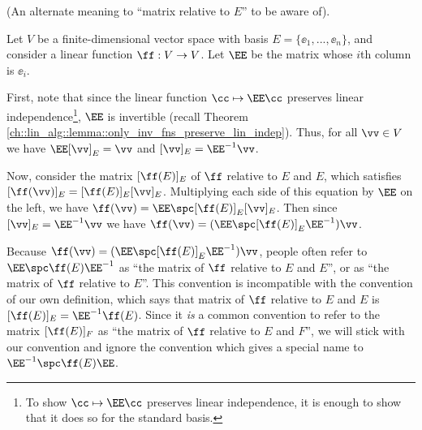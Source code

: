 \begin{remark}
    (An alternate meaning to ``matrix relative to $E$'' to be aware of).
    
    Let $V$ be a finite-dimensional vector space with basis $E = \{\ee_1, ..., \ee_n\}$, and consider a linear function $\ff:V \rightarrow V$. Let $\EE$ be the matrix whose $i$th column is $\ee_i$.
    
    First, note that since the linear function $\cc \mapsto \EE \cc$ preserves linear independence\footnote{To show $\cc \mapsto \EE \cc$ preserves linear independence, it is enough to show that it does so for the standard basis.}, $\EE$ is invertible (recall Theorem \ref{ch::lin_alg::lemma::only_inv_fns_preserve_lin_indep}). Thus, for all $\vv \in V$ we have $\EE [\vv]_E = \vv$ and $[\vv]_E = \EE^{-1} \vv$. 
    
    Now, consider the matrix $[\ff(E)]_E$ of $\ff$ relative to $E$ and $E$, which satisfies $[\ff(\vv)]_E = [\ff(E)]_E [\vv]_E$. Multiplying each side of this equation by $\EE$ on the left, we have $\ff(\vv) = \EE \spc [\ff(E)]_E [\vv]_E$. Then since $[\vv]_E = \EE^{-1} \vv$ we have ${\ff(\vv) = (\EE \spc [\ff(E)]_E \EE^{-1}) \vv}$.
    
    Because $\ff(\vv) = (\EE \spc [\ff(E)]_E \EE^{-1}) \vv$, people often refer to $\EE \spc \ff(E) \EE^{-1}$ as ``the matrix of $\ff$ relative to $E$ and $E$'', or as ``the matrix of $\ff$ relative to $E$''. This convention is incompatible with the convention of our own definition, which says that matrix of $\ff$ relative to $E$ and $E$ is $[\ff(E)]_E = \EE^{-1} \ff(E)$. Since it \textit{is} a common convention to refer to the matrix $[\ff(E)]_F$ as ``the matrix of $\ff$ relative to $E$ and $F$'', we will stick with our convention and ignore the convention which gives a special name to $\EE^{-1} \spc \ff(E) \EE$.
\end{remark}

